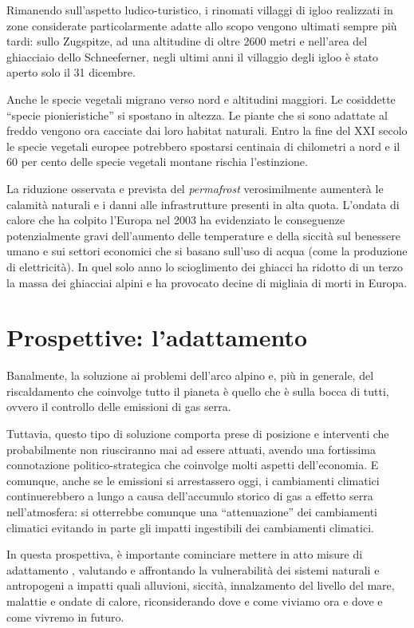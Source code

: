 \documentclass[14pt,a4paper]{article}
\begin{document}
		Rimanendo sull'aspetto ludico-turistico, i rinomati villaggi di igloo realizzati in zone considerate particolarmente adatte allo scopo vengono ultimati sempre più tardi: sullo Zugspitze, ad una altitudine di oltre 2600 metri e nell'area del ghiacciaio dello Schneeferner, negli ultimi anni il villaggio degli igloo è stato aperto solo il 31 dicembre.
		
		Anche le specie vegetali migrano verso nord e altitudini maggiori. Le cosiddette ``specie pionieristiche'' si spostano in altezza. Le piante che si sono adattate al freddo vengono ora cacciate dai loro habitat naturali. Entro la fine del XXI secolo le specie vegetali europee potrebbero spostarsi centinaia di chilometri a nord e il 60 per cento delle specie vegetali montane rischia l'estinzione.
		
		La riduzione osservata e prevista del \textit{permafrost} verosimilmente aumenterà le calamità naturali e i danni alle infrastrutture presenti in alta quota. L'ondata di calore che ha colpito l'Europa nel 2003 ha evidenziato le conseguenze potenzialmente gravi dell'aumento delle temperature e della siccità sul benessere umano e sui settori economici che si basano sull'uso di acqua (come la produzione di elettricità). In quel solo anno lo scioglimento dei ghiacci ha ridotto di un terzo la massa dei ghiacciai alpini e ha provocato decine di migliaia di morti in Europa.
	
	\section{Prospettive: l'adattamento}
		Banalmente, la soluzione ai problemi dell'arco alpino e, più in generale, del riscaldamento che coinvolge tutto il pianeta è quello che è sulla bocca di tutti, ovvero il controllo delle emissioni di gas serra.
		
		Tuttavia, questo tipo di soluzione comporta prese di posizione e interventi che probabilmente non riusciranno mai ad essere attuati, avendo una fortissima connotazione politico-strategica che coinvolge molti aspetti dell'economia. E comunque, anche se le emissioni si arrestassero oggi, i cambiamenti climatici continuerebbero a
		lungo a causa dell'accumulo storico di gas a effetto serra nell'atmosfera: si otterrebbe comunque una ``attenuazione'' dei cambiamenti climatici evitando in parte gli impatti ingestibili dei cambiamenti climatici.
		
		In questa prospettiva, è importante cominciare mettere in atto misure di adattamento \cite{Relazione_AEA}, valutando e affrontando la
		vulnerabilità dei sistemi naturali e antropogeni a impatti quali alluvioni, siccità, innalzamento del livello del mare, malattie e ondate di calore, riconsiderando dove e come viviamo ora e dove e come vivremo in futuro.	
		
\end{document}

